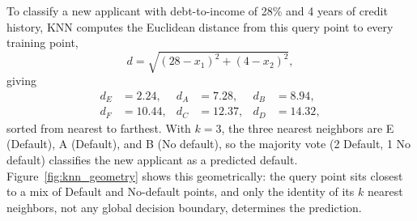 \documentclass[../ai_in_finance]{subfiles}
\begin{document}
To classify a new applicant with debt-to-income of 28\% and 4 years of credit history, KNN computes the Euclidean distance from this query point to every training point,
\begin{equation*}
d = \sqrt{(28 - x_1)^2 + (4 - x_2)^2},
\end{equation*}
giving
\begin{align*}
d_E &= 2.24, & d_A &= 7.28, & d_B &= 8.94, \\
d_F &= 10.44, & d_C &= 12.37, & d_D &= 14.32,
\end{align*}
sorted from nearest to farthest. With $k=3$, the three nearest neighbors are E (Default), A (Default), and B (No default), so the majority vote (2 Default, 1 No default) classifies the new applicant as a predicted default. Figure~\ref{fig:knn_geometry} shows this geometrically: the query point sits closest to a mix of Default and No-default points, and only the identity of its $k$ nearest neighbors, not any global decision boundary, determines the prediction.
\end{document}
